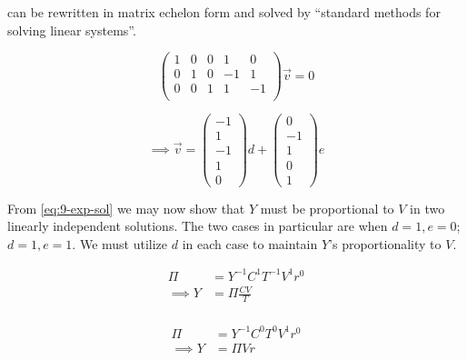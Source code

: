 \documentclass[12pt]{article}
\begin{document}
   can be rewritten in matrix echelon form and solved by
  ``standard methods for solving linear systems''.

  \begin{equation}
    \label{eq:9-matrix}
    \begin{pmatrix}
      1 & 0 & 0 & 1 & 0 \\
      0 & 1 & 0 & -1 & 1 \\
      0 & 0 & 1 & 1 & -1 \\
    \end{pmatrix}
    \vec{v} = 0
  \end{equation}

  \begin{equation}
    \label{eq:9-exp-sol}
    \implies
    \vec{v} =
    \begin{pmatrix}
      -1 \\ 1 \\ -1 \\ 1 \\ 0
    \end{pmatrix}d +
    \begin{pmatrix}
      0 \\ -1 \\ 1 \\ 0 \\ 1
    \end{pmatrix}e
  \end{equation}

  From \cref{eq:9-exp-sol} we may now show that $Y$ must be proportional to $V$
  in two linearly independent solutions. The two cases in particular are when
  $d=1, e=0$; $d=1, e=1$. We must utilize $d$ in each case to maintain $Y$'s
  proportionality to $V$.

  \begin{multicols}{2}
    \begin{equation}
      \label{eq:9-sol-1}
      \boxed{
      \begin{aligned}
        \Pi &= Y^{-1} C^{1} T^{-1} V^1 r^0 \\
        \implies Y &= \Pi\frac{CV}{T} \\
      \end{aligned}
      }
    \end{equation}

    \begin{equation}
      \label{eq:9-sol-2}
      \boxed{
      \begin{aligned}
        \Pi &= Y^{-1} C^{0} T^{0} V^1 r^0 \\
        \implies Y &= \Pi Vr \\
      \end{aligned}
      }
    \end{equation}
  \end{multicols}
\end{document}
